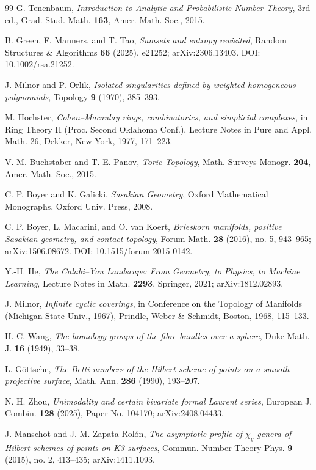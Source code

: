 \documentclass[11pt]{article}
\theoremstyle{definition}
\begin{document}
\begin{thebibliography}{99}
 G. Tenenbaum, \emph{Introduction to Analytic and Probabilistic Number Theory}, 3rd ed., Grad. Stud. Math. \textbf{163}, Amer. Math. Soc., 2015.

 B. Green, F. Manners, and T. Tao, \emph{Sumsets and entropy revisited}, Random Structures \& Algorithms \textbf{66} (2025), e21252; arXiv:2306.13403. DOI: 10.1002/rsa.21252.

 J. Milnor and P. Orlik, \emph{Isolated singularities defined by weighted homogeneous polynomials}, Topology \textbf{9} (1970), 385--393.

 M. Hochster, \emph{Cohen--Macaulay rings, combinatorics, and simplicial complexes}, in Ring Theory II (Proc. Second Oklahoma Conf.), Lecture Notes in Pure and Appl. Math. 26, Dekker, New York, 1977, 171--223.

 V. M. Buchstaber and T. E. Panov, \emph{Toric Topology}, Math. Surveys Monogr. \textbf{204}, Amer. Math. Soc., 2015.

 C. P. Boyer and K. Galicki, \emph{Sasakian Geometry}, Oxford Mathematical Monographs, Oxford Univ. Press, 2008.

 C. P. Boyer, L. Macarini, and O. van Koert, \emph{Brieskorn manifolds, positive Sasakian geometry, and contact topology}, Forum Math. \textbf{28} (2016), no. 5, 943--965; arXiv:1506.08672. DOI: 10.1515/forum-2015-0142.

 Y.-H. He, \emph{The Calabi--Yau Landscape: From Geometry, to Physics, to Machine Learning}, Lecture Notes in Math. \textbf{2293}, Springer, 2021; arXiv:1812.02893.

 J. Milnor, \emph{Infinite cyclic coverings}, in Conference on the Topology of Manifolds (Michigan State Univ., 1967), Prindle, Weber \& Schmidt, Boston, 1968, 115--133.

 H. C. Wang, \emph{The homology groups of the fibre bundles over a sphere}, Duke Math. J. \textbf{16} (1949), 33--38.

 L. G\"ottsche, \emph{The Betti numbers of the Hilbert scheme of points on a smooth projective surface}, Math. Ann. \textbf{286} (1990), 193--207.

 N. H. Zhou, \emph{Unimodality and certain bivariate formal Laurent series}, European J. Combin. \textbf{128} (2025), Paper No. 104170; arXiv:2408.04433.

 J. Manschot and J. M. Zapata Rol\'on, \emph{The asymptotic profile of $\chi_y$-genera of Hilbert schemes of points on K3 surfaces}, Commun. Number Theory Phys. \textbf{9} (2015), no. 2, 413--435; arXiv:1411.1093.


\end{thebibliography}
\end{document}
